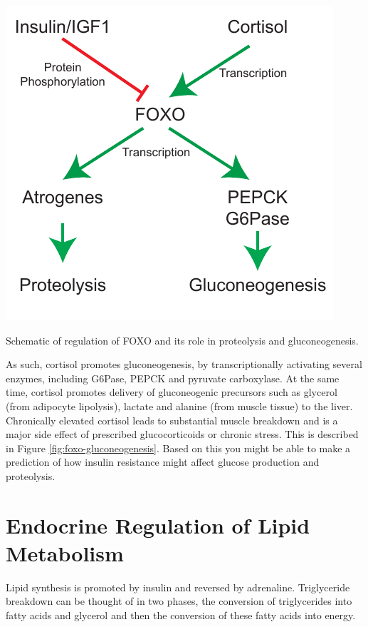 \documentclass{tufte-handout}
\begin{document}
\begin{marginfigure}
\includegraphics{figures/foxo-gluconeogenesis}
\caption{Schematic of regulation of FOXO and its role in proteolysis and gluconeogenesis.}
\label{fig:foxo-gluconeogenesis}
\end{marginfigure}

  As such, cortisol promotes gluconeogenesis, by transcriptionally activating several enzymes, including G6Pase, PEPCK and pyruvate carboxylase.  At the same time, cortisol promotes delivery of gluconeogenic precursors such as glycerol (from adipocyte lipolysis), lactate and alanine (from muscle tissue) to the liver.  Chronically elevated cortisol leads to substantial muscle breakdown and is a major side effect of prescribed glucocorticoids or chronic stress.  This is described in Figure \ref{fig:foxo-gluconeogenesis}. Based on this you might be able to make a prediction of how insulin resistance might affect glucose production and proteolysis.

\section{Endocrine Regulation of Lipid Metabolism}

Lipid synthesis is promoted by insulin and reversed by adrenaline.  Triglyceride breakdown can be thought of in two phases, the conversion of triglycerides into fatty acids and glycerol and then the conversion of these fatty acids into energy.
\end{document}
